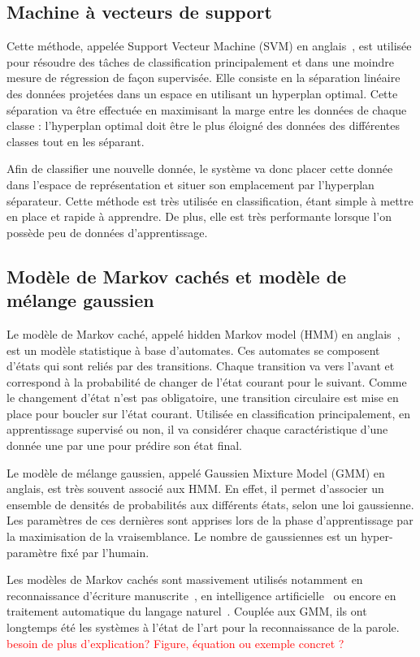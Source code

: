 \subsection{Machine à vecteurs de support}
Cette méthode, appelée Support Vecteur Machine (SVM) en anglais~\cite{Cortes1995}, est utilisée pour résoudre des tâches de classification principalement et dans une moindre mesure de régression de façon supervisée. Elle consiste en la séparation linéaire des données projetées dans un espace en utilisant un hyperplan optimal. Cette séparation va être effectuée en maximisant la marge entre les données de chaque classe : l'hyperplan optimal doit être le plus éloigné des données des différentes classes tout en les séparant.

Afin de classifier une nouvelle donnée, le système va donc placer cette donnée dans l'espace de représentation et situer son emplacement par l'hyperplan séparateur.
Cette méthode est très utilisée en classification, étant simple à mettre en place et rapide à apprendre. De plus, elle est très performante lorsque l'on possède peu de données d'apprentissage.

\subsection{Modèle de Markov cachés et modèle de mélange gaussien}

Le modèle de Markov caché, appelé hidden Markov model (HMM) en anglais~\cite{Rabiner1986}, est un modèle statistique à base d'automates. Ces automates se composent d'états qui sont reliés par des transitions. Chaque transition va vers l'avant et correspond à la probabilité de changer de l'état courant pour le suivant. Comme le changement d'état n'est pas obligatoire, une transition circulaire est mise en place pour boucler sur l'état courant.
Utilisée en classification principalement, en apprentissage supervisé ou non, il va considérer chaque caractéristique d'une donnée une par une pour prédire son état final.

Le modèle de mélange gaussien, appelé Gaussien Mixture Model (GMM) en anglais, est très souvent associé aux HMM. En effet, il permet d'associer un ensemble de densités de probabilités aux différents états, selon une loi gaussienne. Les paramètres de ces dernières sont apprises lors de la phase d'apprentissage par la maximisation de la vraisemblance. Le nombre de gaussiennes est un hyper-paramètre fixé par l'humain.

Les modèles de Markov cachés sont massivement utilisés notamment en reconnaissance d'écriture manuscrite~\cite{Hu1996}, en intelligence artificielle~\cite{Gales2008} ou encore en traitement automatique du langage naturel~\cite{Campbell2006}. Couplée aux GMM, ils ont longtemps été les systèmes à l'état de l'art pour la reconnaissance de la parole.
\textcolor{red}{besoin de plus d'explication? Figure, équation ou exemple concret ?}

